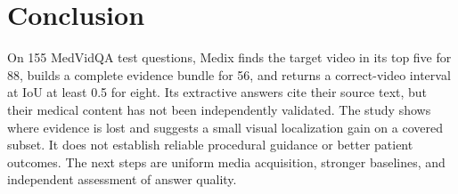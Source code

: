 \documentclass[sigconf,authorversion,nonacm]{acmart}
\begin{document}
\section{Conclusion}
On 155 MedVidQA test questions, Medix finds the target video in its top five for 88, builds a complete evidence bundle for 56, and returns a correct-video interval at IoU at least 0.5 for eight. Its extractive answers cite their source text, but their medical content has not been independently validated. The study shows where evidence is lost and suggests a small visual localization gain on a covered subset. It does not establish reliable procedural guidance or better patient outcomes. The next steps are uniform media acquisition, stronger baselines, and independent assessment of answer quality.



\end{document}
